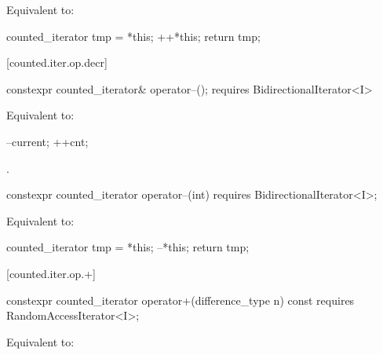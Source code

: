 \begin{addedblock}
\begin{itemdescr}
\pnum
\effects Equivalent to:
\begin{codeblock}
counted_iterator tmp = *this;
++*this;
return tmp;
\end{codeblock}
\end{itemdescr}

[counted.iter.op.decr]{}

%
%
\begin{itemdecl}
  constexpr counted_iterator& operator--();
    requires BidirectionalIterator<I>
\end{itemdecl}

\begin{itemdescr}
\pnum
\effects Equivalent to:
\begin{codeblock}
--current;
++cnt;
\end{codeblock}

\pnum
\returns {}.
\end{itemdescr}

%
%
\begin{itemdecl}
  constexpr counted_iterator operator--(int)
    requires BidirectionalIterator<I>;
\end{itemdecl}

\begin{itemdescr}
\pnum
\effects Equivalent to:
\begin{codeblock}
counted_iterator tmp = *this;
--*this;
return tmp;
\end{codeblock}
\end{itemdescr}

[counted.iter.op.+]{}

%
%
\begin{itemdecl}
  constexpr counted_iterator operator+(difference_type n) const
    requires RandomAccessIterator<I>;
\end{itemdecl}

\begin{itemdescr}
\pnum
\oldtxt{\requires} \newtxt{\expects}

\pnum
\effects Equivalent to:
\end{itemdescr}


\end{addedblock}

